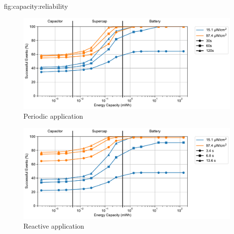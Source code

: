 \begin{definefigure*}{fig:capacity:reliability}
  \centering
  \begin{subfigure}{\columnwidth}
    \centering
    \includegraphics[width=\linewidth]{figs/capacity/sense_and_send/usage_reliability_v_secondary_capacity/events_vs_secondary_size.pdf}
      \caption{Periodic application}
    \label{fig:capacity:reliability:sensesec}
  \end{subfigure}
  \begin{subfigure}{\columnwidth}
    \centering
    \includegraphics[width=\linewidth]{figs/capacity/door_occupancy/events_vs_secondary_size}
    \caption{Reactive application}
    \label{fig:capacity:reliability:eventsec}
  \end{subfigure}
  \caption{
    \normalfont
    Workload reliability
    for different harvesting scenarios, workloads, and idealized secondary storage sizes.
    We define reliability as the percentage of successfully completed completed events.
    As expected, workload reliability follows a similar 
    trend as energy utilization, improving with increased secondary energy
    storage. For both periodic and reactive workloads, from the smallest to
    largest capacity simulated, we see a 1.4-2.7x improvement in availability.
    }
\end{definefigure*}


